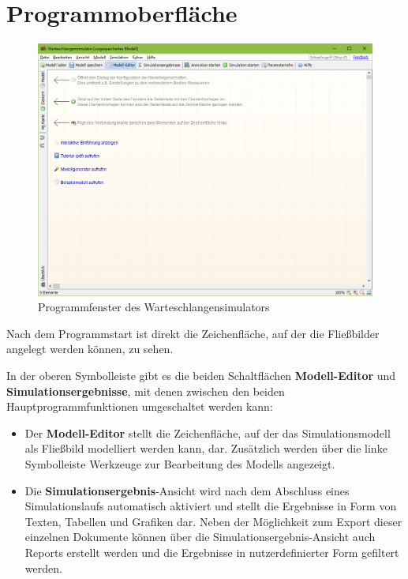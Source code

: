 \documentclass[deutsch]{svmono}
\begin{document}
\chapter{Programmoberfläche}

\begin{figure}[h]	
	\caption{Programmfenster des Warteschlangensimulators}
	\centerline{\includegraphics[width=14cm]{ProgramWindow.png}}
	\label{fig:ProgramWindow}
\end{figure}
 
Nach dem Programmstart ist direkt die Zeichenfläche, auf der die Fließbilder angelegt werden können, zu sehen.

In der oberen Symbolleiste gibt es die beiden Schaltflächen \textbf{Modell-Editor} und \textbf{Simulationsergebnisse}, mit denen zwischen den beiden Hauptprogrammfunktionen umgeschaltet werden kann:

\begin{itemize}
\item
Der \textbf{Modell-Editor} stellt die Zeichenfläche, auf der das Simulationsmodell als Fließbild modelliert werden kann, dar. Zusätzlich werden über die linke Symbolleiste Werkzeuge zur Bearbeitung des Modells angezeigt.
\item
Die \textbf{Simulationsergebnis}-Ansicht wird nach dem Abschluss eines Simulationslaufs automatisch aktiviert und stellt die Ergebnisse in Form von Texten, Tabellen und Grafiken dar. Neben der Möglichkeit zum Export dieser einzelnen Dokumente können über die Simulationsergebnis-Ansicht auch Reports erstellt werden und die Ergebnisse in nutzerdefinierter Form gefiltert werden.
\end{itemize}
\end{document}
